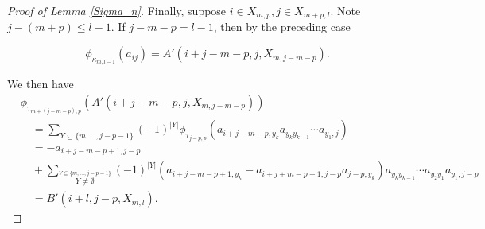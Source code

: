 \documentclass[11pt]{amsart}
\def\t{{\tau}}
\def\k{{\kappa}}
\theoremstyle{definition}
\begin{document}
\begin{proof} [Proof of Lemma \ref{Sigma_n}]
%

Finally, suppose $i\in X_{m,p},j\in X_{m+p,l}$. Note $j-(m+p)\le l-1$. If $j-m-p=l-1$, then by the preceding case

$$\phi_{\k_{m,l-1}}(a_{ij}) = A'(i+j-m-p,j,X_{m,j-m-p}).$$

We then have
{\small
\begin{align*}
&\phi_{\tau_{m + (j-m-p),p}}(A'(i+j-m-p,j,X_{m,j-m-p}))\\
&\quad =\sum_{{\scriptscriptstyle Y\subseteq \{m,\ldots,j - p - 1\}}} (-1)^{|Y|} \phi_{\t_{j-p,p}}(a_{i+j-m-p,y_k}a_{y_ky_{k-1}}\cdots a_{y_1,j})\\
&\quad = -a_{i+j-m-p+1,j-p}\\
&\quad + \sum_{{\scriptscriptstyle \overset{Y\subseteq \{m,\ldots,j - p - 1\}}{Y\ne\emptyset}}} (-1)^{|Y|} (a_{i+j-m-p+1,y_k} -a_{i+j+m-p+1,j-p}a_{j-p,y_k})a_{y_ky_{k-1}}\cdots a_{y_2y_1}a_{y_1,j-p}\\
&\quad = B'(i+l,j-p,X_{m,l}).
\end{align*}
}


\end{proof}
\end{document}
